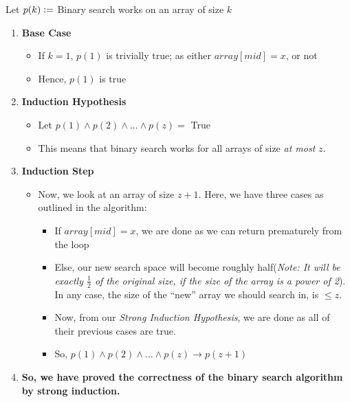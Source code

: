 \documentclass[11pt]{article}
\newcommand{\defeq}{\vcentcolon=}
\begin{document}
Let $p(k) \defeq $ Binary search works on an array of size $k$ 
\begin{enumerate}
    \item \textbf{Base Case}
    \begin{itemize}
        \item If $k=1$, $p(1)$ is trivially true; as either $array[mid] = x$, or not
        \item Hence, $p(1)$ is true
    \end{itemize}
    \item \textbf{Induction Hypothesis}
    \begin{itemize}
        \item Let $p(1) \land p(2) \land \dots \land p(z) = $ True
        \item This means that binary search works for all arrays of size \textit{at most} $z$.
    \end{itemize}
    \item \textbf{Induction Step}
    \begin{itemize}
        \item Now, we look at an array of size $z+1$. Here, we have three cases as outlined in the algorithm:
        \begin{itemize}
            \item If $array[mid] = x$, we are done as we can return prematurely from the loop
            \item Else, our new search space will become roughly half(\textit{Note: It will be exactly $\frac{1}{2}$ of the original size, if the size of the array is a power of 2}). In any case, the size of the ``new'' array we should search in, is $\leq z$.
            \item Now, from our \textit{Strong Induction Hypothesis}, we are done as all of their previous cases are true.
            \item So, $p(1) \land p(2) \land \dots \land p(z) \rightarrow p(z+1)$
        \end{itemize}
    \end{itemize}
    \item \textbf{So, we have proved the correctness of the binary search algorithm by strong induction.}
\end{enumerate}
\end{document}
